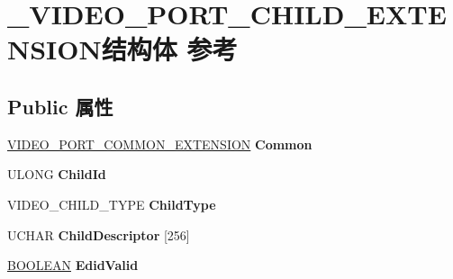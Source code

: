\hypertarget{struct___v_i_d_e_o___p_o_r_t___c_h_i_l_d___e_x_t_e_n_s_i_o_n}{}\section{\+\_\+\+V\+I\+D\+E\+O\+\_\+\+P\+O\+R\+T\+\_\+\+C\+H\+I\+L\+D\+\_\+\+E\+X\+T\+E\+N\+S\+I\+O\+N结构体 参考}
\label{struct___v_i_d_e_o___p_o_r_t___c_h_i_l_d___e_x_t_e_n_s_i_o_n}
\subsection*{Public 属性}
\begin{DoxyCompactItemize}
\item 
\mbox{\label{struct___v_i_d_e_o___p_o_r_t___c_h_i_l_d___e_x_t_e_n_s_i_o_n_a8a8327f71a2965b4994191b3abc12dcf}} 
\hyperlink{struct___v_i_d_e_o___p_o_r_t___c_o_m_m_o_n___e_x_t_e_n_s_i_o_n}{V\+I\+D\+E\+O\+\_\+\+P\+O\+R\+T\+\_\+\+C\+O\+M\+M\+O\+N\+\_\+\+E\+X\+T\+E\+N\+S\+I\+ON} {\bfseries Common}
\item 
\mbox{\label{struct___v_i_d_e_o___p_o_r_t___c_h_i_l_d___e_x_t_e_n_s_i_o_n_a096de31c6ec2aefd2fa41da3963a1b6b}} 
U\+L\+O\+NG {\bfseries Child\+Id}
\item 
\mbox{\label{struct___v_i_d_e_o___p_o_r_t___c_h_i_l_d___e_x_t_e_n_s_i_o_n_a245e69c524accd4e5f82c085fc337381}} 
V\+I\+D\+E\+O\+\_\+\+C\+H\+I\+L\+D\+\_\+\+T\+Y\+PE {\bfseries Child\+Type}
\item 
\mbox{\label{struct___v_i_d_e_o___p_o_r_t___c_h_i_l_d___e_x_t_e_n_s_i_o_n_a15ac41e38ff4d9bf77ae1b74442f9d88}} 
U\+C\+H\+AR {\bfseries Child\+Descriptor} \mbox{[}256\mbox{]}
\item 
\mbox{\label{struct___v_i_d_e_o___p_o_r_t___c_h_i_l_d___e_x_t_e_n_s_i_o_n_a7788a5daa050a32e9681360052ed31ca}} 
\hyperlink{_processor_bind_8h_a112e3146cb38b6ee95e64d85842e380a}{B\+O\+O\+L\+E\+AN} {\bfseries Edid\+Valid}

\end{DoxyCompactItemize}
